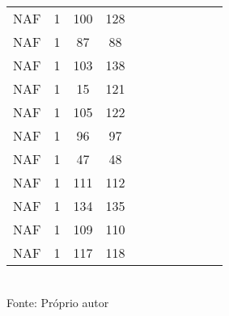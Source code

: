 \begin{table}[H]
{\begin{tabular}{ccccccccccc}
NAF & 1 & 100 & 128 &  &  &  &  &  &  &  \\
NAF & 1 & 87 & 88 &  &  &  &  &  &  &  \\
NAF & 1 & 103 & 138 &  &  &  &  &  &  &  \\
NAF & 1 & 15 & 121 &  &  &  &  &  &  &  \\
NAF & 1 & 105 & 122 &  &  &  &  &  &  &  \\
NAF & 1 & 96 & 97 &  &  &  &  &  &  &  \\
NAF & 1 & 47 & 48 &  &  &  &  &  &  &  \\
NAF & 1 & 111 & 112 &  &  &  &  &  &  &  \\
NAF & 1 & 134 & 135 &  &  &  &  &  &  &  \\
NAF & 1 & 109 & 110 &  &  &  &  &  &  &  \\
NAF & 1 & 117 & 118 &  &  &  &  &  &  &  \\
\bottomrule
\end{tabular}}
\\Fonte: Próprio autor
\end{table}


